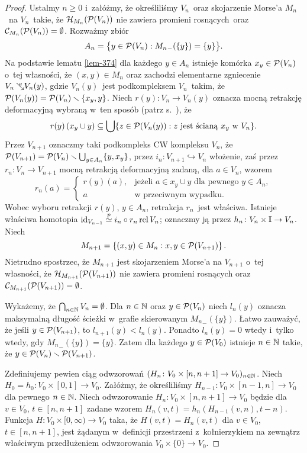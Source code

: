\begin{proof}
Ustalmy $n\geq 0$ i~załóżmy, że określiliśmy $V_n$~oraz skojarzenie Morse'a $M_n$~na $V_n$~takie, że $\mathcal{H}_{M_n}(\mathcal{P}(V_n))$ nie zawiera promieni rosnących~oraz $\mathcal{C}_{M_n}(\mathcal{P}(V_n))=\emptyset$. Rozważmy zbiór \[A_n=\bigl\{y\in\mathcal{P}(V_n):{M_n}_-(\{y\})=\{y\}\bigr\}.\] Na podstawie lematu \ref{lem-374} dla każdego $y\in A_n$ istnieje  komórka $x_y\in \mathcal{P}(V_n)$ o~tej własności, że $(x,y)\in M_n$ oraz zachodzi elementarne zgniecenie $V_n\mbox{$\hspace{2pt}\searrow\hspace{-9pt}^\mathrm{e}\hspace{2pt}$} V_n(y)$, gdzie $V_n(y)$~jest podkompleksem $V_n$~takim, że $\mathcal{P}(V_n(y))=\mathcal{P}(V_n)\smallsetminus\left\{x_y,y\right\}$. Niech $r(y)\colon V_n\to V_n(y)$ oznacza mocną retrakcję deformacyjną wybraną w~ten sposób (patrz s.~\pageref{mocna_retr_def_przy_el_zgnieceniu_ze_jest_fajna}), że \[r(y)\left(x_y\cup y\right)\subseteq \bigcup\{z\in \mathcal{P}(V_n(y)):z \text{ jest ścianą } x_y \text{ w } V_n\}.\] Przez $V_{n+1}$ oznaczmy taki podkompleks CW kompleksu $V_n$, że $\mathcal{P}(V_{n+1})=\mathcal{P}(V_n)\smallsetminus\bigcup_{y\in A_n}\{y,x_y\}$, przez $i_{n}\colon V_{n+1}\hookrightarrow V_n$ włożenie, zaś przez $r_n\colon V_{n}\to V_{n+1}$ mocną retrakcją deformacyjną zadaną, dla $a\in V_n$, wzorem \[r_n(a)=\begin{cases}r(y)(a), & \text{jeżeli } a\in x_y\cup y \text{ dla pewnego } y\in A_n,\\ a & \text{w przeciwnym wypadku.}\end{cases}\] Wobec wyboru retrakcji $r(y)$, $y\in A_n$, retrakcja $r_n$~jest właściwa. Istnieje właściwa homotopia $\operatorname{id}_{V_{n-1}}\stackrel{p}{\simeq} i_{n}\circ r_n \operatorname{rel} V_n$; oznaczmy ją przez $h_{n}\colon V_{n}\times \mathbb{I}\to V_{n}$. Niech \[M_{n+1}=\left\{(x,y)\in M_n:x,y\in\mathcal{P}(V_{n+1})\right\}.\] Nietrudno spostrzec, że $M_{n+1}$ jest skojarzeniem Morse'a na $V_{n+1}$ o~tej własności, że $\mathcal{H}_{M_{n+1}}(\mathcal{P}(V_{n+1}))$ nie zawiera promieni rosnących oraz $\mathcal{C}_{M_{n+1}}(\mathcal{P}(V_{n+1}))=\emptyset$.

Wykażemy, że $\bigcap_{n\in\mathbb{N}} V_n=\emptyset$. Dla $n\in\mathbb{N}$ oraz $y\in \mathcal{P}(V_n)$ niech $l_n(y)$ oznacza maksymalną długość ścieżki w~grafie skierowanym ${M_{n}}_{-}(\{y\})$. Łatwo zauważyć, że jeśli $y\in \mathcal{P}(V_{n+1})$, to $l_{n+1}(y)<l_n(y)$. Ponadto $l_n(y)=0$ wtedy i~tylko wtedy, gdy ${M_{n}}_{-}(\{y\})=\{y\}$. Zatem dla każdego $y\in \mathcal{P}(V_0)$ istnieje $n\in \mathbb{N}$ takie, że $y\in \mathcal{P}(V_n)\smallsetminus \mathcal{P}(V_{n+1})$. 

Zdefiniujemy pewien ciąg odwzorowań $(H_n\colon V_0\times [n,n+1]\to V_0)_{n\in\mathbb{N}}$. Niech $H_0=h_0\colon V_0\times [0,1]\to V_0$. Załóżmy, że określiliśmy $H_{n-1}\colon V_0\times [n-1,n]\to V_0$ dla pewnego $n\in\mathbb{N}$. Niech odwzorowanie $H_n\colon V_0\times [n,n+1]\to V_0$ będzie dla $v\in V_0$, $t\in [n,n+1]$ zadane wzorem $H_n(v,t)=h_{n}(H_{n-1}(v,n),t-n)$. Funkcja $H\colon V_0\times [0,\infty)\to V_0$ taka, że $H(v,t)=H_n(v,t)$ dla $v\in V_0$, $t\in [n,n+1]$, jest żądanym w~definicji przestrzeni z~kołnierzykiem na zewnątrz właściwym przedłużeniem odwzorowania $V_0\times\{0\}\to V_0$.  
\end{proof}

